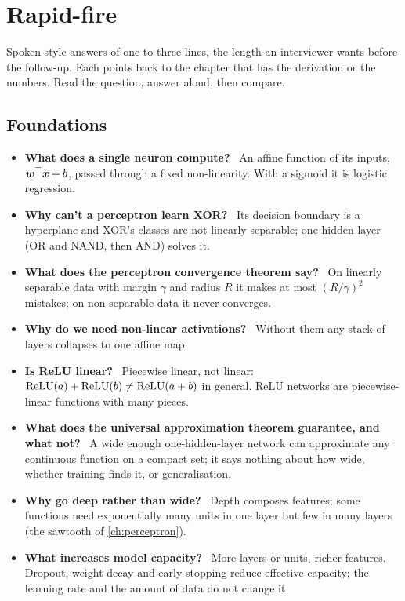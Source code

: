 \chapter{Rapid-fire}
\label{ch:rapidfire}

Spoken-style answers of one to three lines, the length an interviewer wants before the
follow-up. Each points back to the chapter that has the derivation or the numbers. Read the
question, answer aloud, then compare.

\newcommand{\rf}[1]{\stepcounter{rfc}\item[\arabic{rfc}.] \textbf{#1}\ }
\newenvironment{rapid}{\begin{itemize}\setlength{\itemsep}{2pt}\small}{\end{itemize}}

\section{Foundations}
\begin{rapid}
	\rf{What does a single neuron compute?} An affine function of its inputs, ${\bm{w}}^{\top}{\bm{x}}+b$, passed through a fixed
	non-linearity. With a sigmoid it is logistic regression.
	\rf{Why can't a perceptron learn XOR?} Its decision boundary is a hyperplane and XOR's classes are not linearly
	separable; one hidden layer (OR and NAND, then AND) solves it.
	\rf{What does the perceptron convergence theorem say?} On linearly separable data with margin $\gamma$ and radius $R$
	it makes at most $(R/\gamma)^2$ mistakes; on non-separable data it never converges.
	\rf{Why do we need non-linear activations?} Without them any stack of layers collapses to one affine map.
	\rf{Is ReLU linear?} Piecewise linear, not linear: $\operatorname{ReLU}(a)+\operatorname{ReLU}(b)\ne\operatorname{ReLU}(a+b)$ in general. ReLU networks are
	piecewise-linear functions with many pieces.
	\rf{What does the universal approximation theorem guarantee, and what not?} A wide enough one-hidden-layer network can
	approximate any continuous function on a compact set; it says nothing about how wide, whether training finds it, or
	generalisation.
	\rf{Why go deep rather than wide?} Depth composes features; some functions need exponentially many units in one layer
	but few in many layers (the sawtooth of \cref{ch:perceptron}).
	\rf{What increases model capacity?} More layers or units, richer features. Dropout, weight decay and early stopping
	reduce effective capacity; the learning rate and the amount of data do not change it.
\end{rapid}

